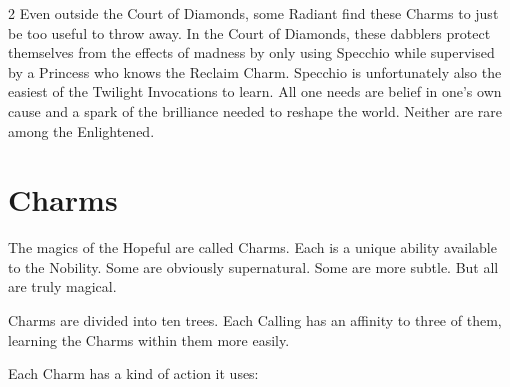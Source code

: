 \begin{multicols}{2}
Even outside the Court of Diamonds, some Radiant find these Charms to just be too useful to throw away. In the Court of Diamonds, these dabblers protect themselves from the effects of madness by only using Specchio while supervised by a Princess who knows the Reclaim Charm. Specchio is unfortunately also the easiest of the Twilight Invocations to learn. All one needs are belief in one's own cause and a spark of the brilliance needed to reshape the world. Neither are rare among the Enlightened.

\bigsidebarend

\section*{Charms}
\label{sec:Charms}
The magics of the Hopeful are called Charms. Each is a unique ability available to the Nobility. Some are obviously supernatural. Some are more subtle. But all are truly magical. 

Charms are divided into ten trees. Each Calling has an affinity to three of them, learning the Charms within them more easily. 

Each Charm has a kind of action it uses: 


\end{multicols}

